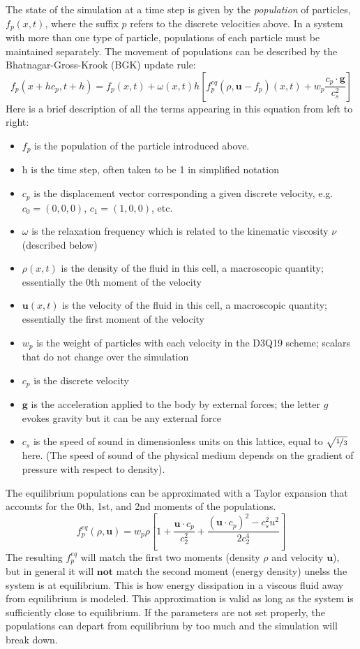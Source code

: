 \documentclass[11pt]{article} %
\renewcommand{\vec}[1]{\mathbf{#1}}
\begin{document}
The state of the simulation at a time step is given by the \textit{population} of particles, 
$f_p(x,t)$, where the suffix $p$ refers to the discrete velocities above.
In a system with more than one type of particle, populations of each particle must be maintained separately.  
The movement of populations can be described by the Bhatnagar-Gross-Krook (BGK) update rule:
$$f_p(x + hc_p, t + h) = f_p(x,t) + \omega(x,t) h \left[f_p^{eq}(\rho, \vec{u} - f_p)(x,t) + w_p \frac{c_p \cdot \vec{g}}{c_s^2} \right]$$
Here is a brief description of all the terms appearing in this equation from left to right:
\begin{itemize}
\item $f_p$ is the population of the particle introduced above.
\item h is the time step, often taken to be 1 in simplified notation
\item $c_p$ is the displacement vector corresponding a given discrete velocity, e.g. \\
$c_0 = (0,0,0)$,  $c_1 = (1,0,0)$, etc.
\item $\omega$ is the relaxation frequency which is related to the kinematic viscosity $\nu$ (described below)
\item $\rho(x,t)$ is the density of the fluid in this cell, a macroscopic quantity; essentially the 0th moment of the velocity
\item $\vec{u}(x,t)$ is the velocity of the fluid in this cell, a macroscopic quantity; essentially the first moment of the velocity
\item $w_p$ is the weight of particles with each velocity in the D3Q19 scheme; scalars that do not change over the simulation
\item $c_p$ is the discrete velocity
\item $\vec{g}$ is the acceleration applied to the body by external forces; the letter $g$ evokes gravity but it can be any external force
\item $c_s$ is the speed of sound in dimensionless units on this lattice, equal to $\sqrt{\nicefrac{1}{3}}$ here.
(The speed of sound of the physical medium depends on the gradient of pressure with respect to density).
\end{itemize}

The equilibrium populations can be approximated with a Taylor expansion that
accounts for the 0th, 1st, and 2nd moments of the populations.
$$f_p^{eq}(\rho, \vec{u}) = w_p \rho \left[1 + \frac{\vec{u} \cdot c_p}{c_2^2} + \frac{(\vec{u} \cdot c_p)^2 - c_s^2u^2}{2c_2^4} \right] $$
The resulting $f_p^{eq}$ will match the first two moments (density $\rho$ and velocity $\vec{u}$),
but in general it will $\textbf{not}$ match the second moment (energy density) unelss the system is at equilibrium.
This is how energy dissipation in a viscous fluid away from equilibrium is modeled.
This approximation is valid as long as the system is sufficiently close to equilibrium.
If the parameters are not set properly, the populations can depart from equilibrium by too much
and the simulation will break down.
\end{document}
